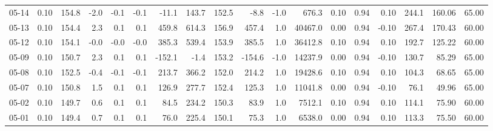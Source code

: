 \begin{threeparttable}
{\begin{tabular}{lrrrrrrrrrrrrrrrrr}
  05-14 &     0.10 & 154.8 &              -2.0 &              -0.1 &               -0.1 &              -11.1 &  143.7 & 152.5 &       -8.8 &                     -1.0 &               676.3 &       0.10 &      0.94 &           0.10 &            244.1 &          160.06 &                  65.00 \\
  05-13 &     0.10 & 154.4 &               2.3 &               0.1 &                0.1 &              459.8 &  614.3 & 156.9 &      457.4 &                      1.0 &             40467.0 &       0.00 &      0.94 &          -0.10 &            267.4 &          170.43 &                  60.00 \\
  05-12 &     0.10 & 154.1 &              -0.0 &              -0.0 &               -0.0 &              385.3 &  539.4 & 153.9 &      385.5 &                      1.0 &             36412.8 &       0.10 &      0.94 &           0.10 &            192.7 &          125.22 &                  60.00 \\
  05-09 &     0.10 & 150.7 &               2.3 &               0.1 &                0.1 &             -152.1 &   -1.4 & 153.2 &     -154.6 &                     -1.0 &             14237.9 &       0.00 &      0.94 &          -0.10 &            130.7 &           85.29 &                  65.00 \\
  05-08 &     0.10 & 152.5 &              -0.4 &              -0.1 &               -0.1 &              213.7 &  366.2 & 152.0 &      214.2 &                      1.0 &             19428.6 &       0.10 &      0.94 &           0.10 &            104.3 &           68.65 &                  65.00 \\
  05-07 &     0.10 & 150.8 &               1.5 &               0.1 &                0.1 &              126.9 &  277.7 & 152.4 &      125.3 &                      1.0 &             11041.8 &       0.00 &      0.94 &          -0.10 &             76.1 &           49.96 &                  65.00 \\
  05-02 &     0.10 & 149.7 &               0.6 &               0.1 &                0.1 &               84.5 &  234.2 & 150.3 &       83.9 &                      1.0 &              7512.1 &       0.10 &      0.94 &           0.10 &            114.1 &           75.90 &                  60.00 \\
  05-01 &     0.10 & 149.4 &               0.7 &               0.1 &                0.1 &               76.0 &  225.4 & 150.1 &       75.3 &                      1.0 &              6538.0 &       0.00 &      0.94 &           0.10 &            113.3 &           75.50 &                  60.00 \\

\end{tabular}}
\end{threeparttable}
